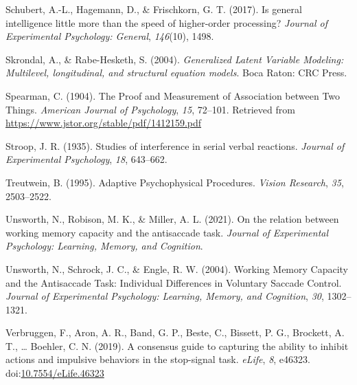 \documentclass[
  ,man,floatsintext]{apa6}
\newlength{\cslhangindent}
\newlength{\cslentryspacingunit} %
\newenvironment{CSLReferences}[2] %
 {%
  \setlength{\parindent}{0pt}
  \ifodd #1
  \let\oldpar\par
  \def\par{\hangindent=\cslhangindent\oldpar}
  \fi
  \setlength{\parskip}{#2\cslentryspacingunit}
 }%
 {}
\begin{document}
\begin{CSLReferences}{1}{0}
\leavevmode{}%
Schubert, A.-L., Hagemann, D., \& Frischkorn, G. T. (2017). Is general intelligence little more than the speed of higher-order processing? \emph{Journal of Experimental Psychology: General}, \emph{146}(10), 1498.

\leavevmode{}%
Skrondal, A., \& Rabe-Hesketh, S. (2004). \emph{Generalized {Latent Variable Modeling}: Multilevel, longitudinal, and structural equation models}. {Boca Raton}: {CRC Press}.

\leavevmode{}%
Spearman, C. (1904). The {Proof} and {Measurement} of {Association} between {Two Things}. \emph{American Journal of Psychology}, \emph{15}, 72--101. Retrieved from \url{https://www.jstor.org/stable/pdf/1412159.pdf}

\leavevmode{}%
Stroop, J. R. (1935). Studies of interference in serial verbal reactions. \emph{Journal of Experimental Psychology}, \emph{18}, 643--662.

\leavevmode{}%
Treutwein, B. (1995). Adaptive {Psychophysical Procedures}. \emph{Vision Research}, \emph{35}, 2503--2522.

\leavevmode{}%
Unsworth, N., Robison, M. K., \& Miller, A. L. (2021). On the relation between working memory capacity and the antisaccade task. \emph{Journal of Experimental Psychology: Learning, Memory, and Cognition}.

\leavevmode{}%
Unsworth, N., Schrock, J. C., \& Engle, R. W. (2004). Working {Memory Capacity} and the {Antisaccade Task}: {Individual Differences} in {Voluntary Saccade Control}. \emph{Journal of Experimental Psychology: Learning, Memory, and Cognition}, \emph{30}, 1302--1321.

\leavevmode{}%
Verbruggen, F., Aron, A. R., Band, G. P., Beste, C., Bissett, P. G., Brockett, A. T., \ldots{} Boehler, C. N. (2019). A consensus guide to capturing the ability to inhibit actions and impulsive behaviors in the stop-signal task. \emph{eLife}, \emph{8}, e46323. doi:\href{https://doi.org/10.7554/eLife.46323}{10.7554/eLife.46323}

\end{CSLReferences}
\end{document}
